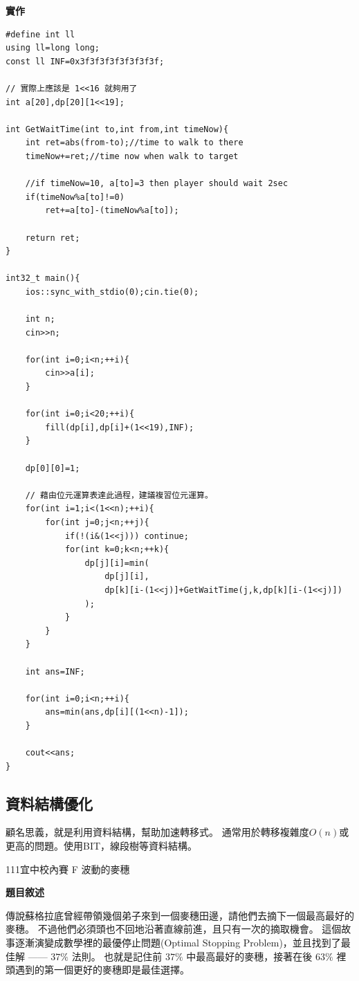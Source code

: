     \textbf{實作}

\begin{lstlisting}[caption={TIOJ 1014題解}]
#define int ll
using ll=long long;
const ll INF=0x3f3f3f3f3f3f3f3f;

// 實際上應該是 1<<16 就夠用了
int a[20],dp[20][1<<19];

int GetWaitTime(int to,int from,int timeNow){
    int ret=abs(from-to);//time to walk to there
    timeNow+=ret;//time now when walk to target

    //if timeNow=10, a[to]=3 then player should wait 2sec
    if(timeNow%a[to]!=0)
        ret+=a[to]-(timeNow%a[to]);

    return ret;
}

int32_t main(){
    ios::sync_with_stdio(0);cin.tie(0);
    
    int n;
    cin>>n;

    for(int i=0;i<n;++i){
        cin>>a[i];
    }

    for(int i=0;i<20;++i){
        fill(dp[i],dp[i]+(1<<19),INF);
    }

    dp[0][0]=1;

    // 藉由位元運算表達此過程，建議複習位元運算。
    for(int i=1;i<(1<<n);++i){
        for(int j=0;j<n;++j){
            if(!(i&(1<<j))) continue;
            for(int k=0;k<n;++k){
                dp[j][i]=min(
                    dp[j][i],
                    dp[k][i-(1<<j)]+GetWaitTime(j,k,dp[k][i-(1<<j)])
                );
            }
        }
    }

    int ans=INF;

    for(int i=0;i<n;++i){
        ans=min(ans,dp[i][(1<<n)-1]);
    }

    cout<<ans;
}
\end{lstlisting}

    \subsection{資料結構優化}
    顧名思義，就是利用資料結構，幫助加速轉移式。
    通常用於轉移複雜度$O(n)$或更高的問題。使用BIT，線段樹等資料結構。

    \example 111宜中校內賽 F 波動的麥穗

    \textbf{題目敘述}

    傳說蘇格拉底曾經帶領幾個弟子來到一個麥穗田邊，請他們去摘下一個最高最好的麥穗。
    不過他們必須頭也不回地沿著直線前進，且只有一次的摘取機會。
    這個故事逐漸演變成數學裡的最優停止問題(Optimal Stopping Problem)，並且找到了最佳解 —— $37\%$ 法則。
    也就是記住前 $37\%$ 中最高最好的麥穗，接著在後 $63\%$ 裡頭遇到的第一個更好的麥穗即是最佳選擇。

